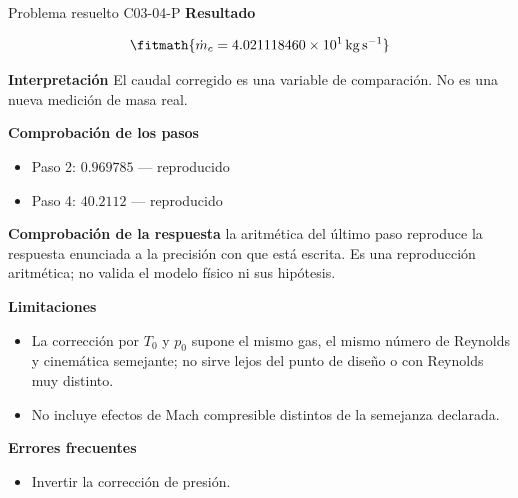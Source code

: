 \documentclass[10pt,openany]{book}
\begin{document}
\begin{studiumworked}{Problema resuelto C03-04-P}
\noindent\textbf{Resultado}

\[
\fitmath{\dot{m}_c=4.021118460\times10^{1}\,\mathrm{kg}\,\mathrm{s}^{-1}}
\]

\noindent\textbf{Interpretación}
El caudal corregido es una variable de comparación. No es una nueva medición de masa real.

\noindent\textbf{Comprobación de los pasos}
\begin{itemize}
\item Paso 2: $0.969785$ — reproducido
\item Paso 4: $40.2112$ — reproducido
\end{itemize}

\noindent\textbf{Comprobación de la respuesta} la aritmética del último paso reproduce la respuesta enunciada a la precisión con que está escrita. Es una reproducción aritmética; no valida el modelo físico ni sus hipótesis.

\noindent\textbf{Limitaciones}
\begin{itemize}
\item La corrección por $T_0$ y $p_0$ supone el mismo gas, el mismo número de Reynolds y cinemática semejante; no sirve lejos del punto de diseño o con Reynolds muy distinto.
\item No incluye efectos de Mach compresible distintos de la semejanza declarada.
\end{itemize}

\noindent\textbf{Errores frecuentes}
\begin{itemize}
\item Invertir la corrección de presión.
\end{itemize}
\end{studiumworked}
\end{document}
